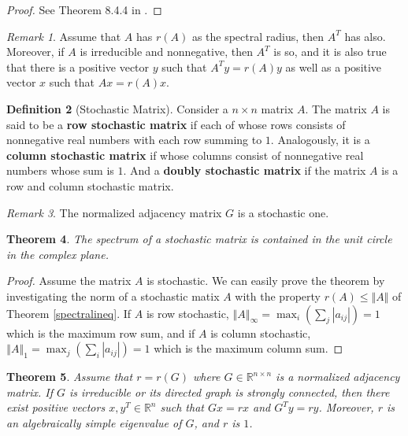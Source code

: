 \documentclass[11pt, a4paper, oneside, openany, reqno]{book}
\newtheorem{theorem}{Theorem}[chapter]
\theoremstyle{definition}
\newtheorem{definition}[theorem]{Definition}
\theoremstyle{remark}
\newtheorem{remark}[theorem]{Remark}
\numberwithin{equation}{chapter} %
\newcommand{\R}{\ensuremath{{\mathbb R}}}
\begin{document}
\begin{proof}
	See Theorem 8.4.4 in \cite{horn}.
\end{proof}

\begin{remark}
	Assume that $ A $ has $ r(A) $ as the spectral radius, then $ A^T $ has also.
	Moreover, if $ A $ is irreducible and nonnegative, then $ A^T $ is so, and
	it is also true that there is a positive vector $ y $ such that $ A^Ty =r(A)y $
	as well as a positive vector $ x $ such that $ Ax=r(A)x $.
\end{remark}

\begin{definition}[Stochastic Matrix]
	Consider a $ n \times n $ matrix $ A $.
    The matrix $ A $ is said to be a \textbf{row stochastic matrix} 
		if each of whose rows consists of nonnegative real numbers with 
		each row summing to $ 1 $.
    Analogously, it is a \textbf{column stochastic matrix} if 
	whose columns consist of nonnegative real numbers whose sum is $ 1 $.
    And a \textbf{doubly stochastic matrix} if the matrix $ A $ 
	is a row and column stochastic matrix.
\end{definition}

\begin{remark}
	The normalized adjacency matrix $ G $ is a stochastic one.
\end{remark}

\begin{theorem}\label{sdisk}
	The spectrum of a stochastic matrix is contained in the unit circle in the complex plane.	
\end{theorem}
\begin{proof}
	Assume the matrix $ A $ is stochastic.
	We can easily prove the theorem by investigating the norm of a stochastic matix $ A $ 
	with the property $ r(A) \leq \Vert A \Vert $ of Theorem \ref{spectralineq}.	
	If $ A $ is row stochastic, 
		$ \left\Vert A\right\Vert _\infty 
		= \max_i \left(\sum_j \left\vert a_{ij}\right\vert\right)=1 $
		which is the maximum row sum,
	and if $ A $ is column stochastic,
		$ \left\Vert A\right\Vert _1 		
		= \max_j \left(\sum_i \left\vert a_{ij}\right\vert\right)=1 $
		which is the maximum column sum.
\end{proof}

\begin{theorem}\label{poseigenv}
	Assume that $ r = r(G) $
	where $ G \in \R^{n \times n} $ is a normalized adjacency matrix.
	If $ G $ is irreducible or its directed graph is strongly connected, then 
	there exist positive vectors $ x,y^T \in \R^n $ 
	such that $ Gx=r x $ and $ G^T y = r y$.
	Moreover, $ r $ is an algebraically simple eigenvalue of $ G $, 
	and $ r $ is $ 1 $.
\end{theorem}
\end{document}
